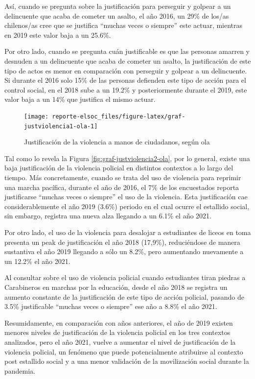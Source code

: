 \documentclass[
  12pt,
]{book}
\begin{document}
Así, cuando se pregunta sobre la justificación para perseguir y golpear a un delincuente que acaba de cometer un asalto, el año 2016, un 29\% de los/as chilenos/as cree que se justifica ``muchas veces o siempre'' este actuar, mientras en 2019 este valor baja a un 25.6\%.

Por otro lado, cuando se pregunta cuán justificable es que las personas amarren y desnuden a un delincuente que acaba de cometer un asalto, la justificación de este tipo de actos es menor en comparación con perseguir y golpear a un delincuente. Si durante el 2016 solo 15\% de las personas defienden este tipo de acción para el control social, en el 2018 sube a un 19.2\% y posteriormente durante el 2019, este valor baja a un 14\% que justifica el mismo actuar.

\begin{figure}

{\centering \texttt{[image: reporte-elsoc\_files/figure-latex/graf-justviolencia1-ola-1]} 

}

\caption{Justificación de la violencia a manos de ciudadanos, según ola}\label{fig:graf-justviolencia1-ola}
\end{figure}

Tal como lo revela la Figura \ref{fig:graf-justviolencia2-ola}, por lo general, existe una baja justificación de la violencia policial en distintos contextos a lo largo del tiempo. Más concretamente, cuando se trata del uso de violencia para reprimir una marcha pacífica, durante el año de 2016, el 7\% de los encuestados reporta justificarse ``muchas veces o siempre'' el uso de la violencia. Esta justificación cae considerablemente el año 2019 (3.6\%) periodo en el cual ocurre el estallido social, sin embargo, registra una nueva alza llegando a un 6.1\% el año 2021.

Por otro lado, el uso de la violencia para desalojar a estudiantes de liceos en toma presenta un peak de justificación el año 2018 (17,9\%), reduciéndose de manera sustantiva el año 2019 llegando a sólo un 8.2\%, pero aumentando nuevamente a un 12.2\% el año 2021.

Al consultar sobre el uso de violencia policial cuando estudiantes tiran piedras a Carabineros en marchas por la educación, desde el año 2018 se registra un aumento constante de la justificación de este tipo de acción policial, pasando de 3.5\% justificable ``muchas veces o siempre'' ese año a 8.8\% el año 2021.

Resumidamente, en comparación con años anteriores, el año de 2019 existen menores niveles de justificación de la violencia policial en los tres contextos analizados, pero el año 2021, vuelve a aumentar el nivel de justificación de la violencia policial, un fenómeno que puede potencialmente atribuirse al contexto post estallido social y a una menor validación de la movilización social durante la pandemia.
\end{document}
